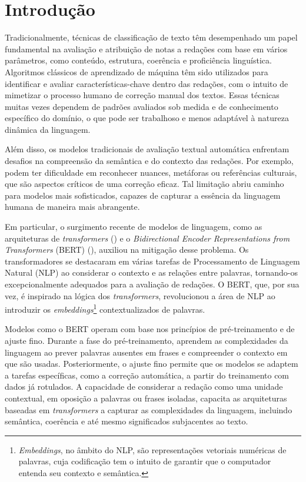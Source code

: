 \chapter{Introdução}

Tradicionalmente, técnicas de classificação de texto têm desempenhado um papel fundamental na avaliação e atribuição de notas a redações com base em vários parâmetros, como conteúdo, estrutura, coerência e proficiência linguística. Algoritmos clássicos de aprendizado de máquina têm sido utilizados para identificar e avaliar características-chave dentro das redações, com o intuito de mimetizar o processo humano de correção manual dos textos. Essas técnicas muitas vezes dependem de padrões avaliados sob medida e de conhecimento específico do domínio, o que pode ser trabalhoso e menos adaptável à natureza dinâmica da linguagem.

Além disso, os modelos tradicionais de avaliação textual automática enfrentam desafios na compreensão da semântica e do contexto das redações. Por exemplo, podem ter dificuldade em reconhecer nuances, metáforas ou referências culturais, que são aspectos críticos de uma correção eficaz. Tal limitação abriu caminho para modelos mais sofisticados, capazes de capturar a essência da linguagem humana de maneira mais abrangente.

Em particular, o surgimento recente de modelos de linguagem, como as arquiteturas de \textit{transformers} (\cite{attention2017}) e o \textit{Bidirectional Encoder Representations from Transformers} (BERT) (\cite{bert2018}), auxiliou na mitigação desse problema. Os transformadores se destacaram em várias tarefas de Processamento de Linguagem Natural (NLP) ao considerar o contexto e as relações entre palavras, tornando-os excepcionalmente adequados para a avaliação de redações. O BERT, que, por sua vez, é inspirado na lógica dos \textit{transformers}, revolucionou a área de NLP ao introduzir os \textit{embeddings}\footnote{\textit{Embeddings}, no âmbito do NLP, são representações vetoriais numéricas de palavras, cuja codificação tem o intuito de garantir que o computador entenda seu contexto e semântica.} contextualizados de palavras.

Modelos como o BERT operam com base nos princípios de pré-treinamento e de ajuste fino. Durante a fase do pré-treinamento, aprendem as complexidades da linguagem ao prever palavras ausentes em frases e compreender o contexto em que são usadas. Posteriormente, o ajuste fino permite que os modelos se adaptem a tarefas específicas, como a correção automática, a partir do treinamento com dados já rotulados. A capacidade de considerar a redação como uma unidade contextual, em oposição a palavras ou frases isoladas, capacita as arquiteturas baseadas em \textit{transformers} a capturar as complexidades da linguagem, incluindo semântica, coerência e até mesmo significados subjacentes ao texto.

